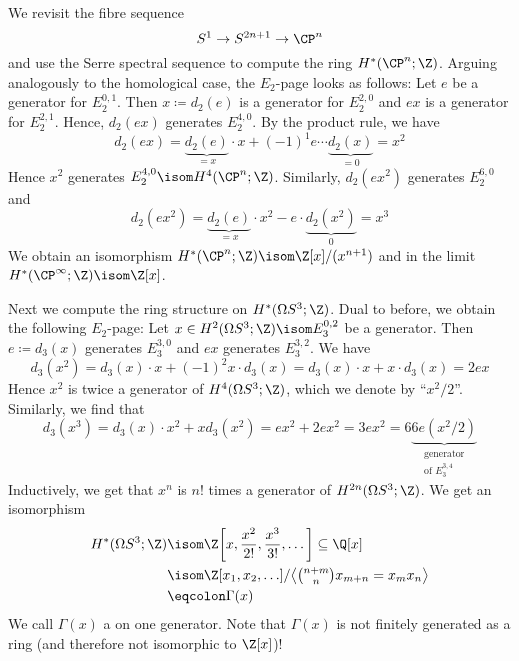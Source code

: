 \begin{example}
	We revisit the fibre sequence
	\begin{equation*}
		S^1 \to S^{2n + 1} \to \CP^n
	\end{equation*}
	and use the Serre spectral sequence to compute the ring $H^*(\CP^n; \Z)$.
	Arguing analogously to the homological case, the $E_2$-page looks as follows:
	Let $e$ be a generator for $E_2^{0, 1}$.
	Then $x \coloneq d_2(e)$ is a generator for $E_2^{2, 0}$ and $e x$ is a generator for $E_2^{2, 1}$.
	Hence, $d_2(ex)$ generates $E_2^{4, 0}$.
	By the product rule, we have
	\begin{equation*}
		d_2(ex) = \underbrace{d_2(e)}_{= x} \cdot x + (-1)^1 e \cdots \underbrace{d_2(x)}_{= 0} = x^2
	\end{equation*}
	Hence $x^2$ generates $E_2^{4, 0} \isom H^4(\CP^n; \Z)$.
	Similarly, $d_2(ex^2)$ generates $E_2^{6, 0}$ and
	\begin{equation*}
		d_2(ex^2) = \underbrace{d_2(e)}_{= x} \cdot x^2 - e \cdot \underbrace{d_2(x^2)}_{0} = x^3
	\end{equation*}
	We obtain an isomorphism $H^*(\CP^n; \Z) \isom \Z[x] / (x^{n + 1})$ and in the limit $H^*(\CP^\infty; \Z) \isom \Z[x]$.
\end{example}
\begin{example}
	Next we compute the ring structure on $H^*(\Omega S^3; \Z)$.
	Dual to before, we obtain the following $E_2$-page:
	Let $x \in H^2(\Omega S^3; \Z) \isom E_3^{0, 2}$ be a generator.
	Then $e \coloneq d_3(x)$ generates $E_3^{3, 0}$ and $ex$ generates $E_3^{3, 2}$.
	We have 
	\begin{equation*}
		d_3(x^2) = d_3(x) \cdot x + (-1)^2 x \cdot d_3(x) = d_3(x) \cdot x + x \cdot d_3(x) = 2ex
	\end{equation*}
	Hence $x^2$ is twice a generator of $H^4(\Omega S^3; \Z)$, which we denote by \enquote{$x^2 / 2$}.
	Similarly, we find that
	\begin{equation*}
		d_3(x^3) = d_3(x) \cdot x^2 + x d_3(x^2) = ex^2 + 2ex^2 = 3ex^2 = 6 \underbrace{6 e (x^2 / 2)}_{\substack{\text{generator} \\ \text{of } E_3^{3, 4}}}
	\end{equation*}
	Inductively, we get that $x^n$ is $n!$ times a generator of $H^{2n}(\Omega S^3; \Z)$.
	We get an isomorphism
	\begin{align*}
		H^*(\Omega S^3; \Z) &\isom \Z\bigg[x, \frac{x^2}{2!}, \frac{x^3}{3!}, \ldots\bigg] \subseteq \Q[x] \\
							&\isom \Z[x_1, x_2, \ldots] / \big\langle {\textstyle\binom{n + m}{n}} x_{m + n} = x_m x_n \big\rangle \\
							&\eqcolon \Gamma(x)
	\end{align*}
	We call $\Gamma(x)$ a  on one generator.
	Note that $\Gamma(x)$ is not finitely generated as a ring (and therefore not isomorphic to $\Z[x]$)!
\end{example}
